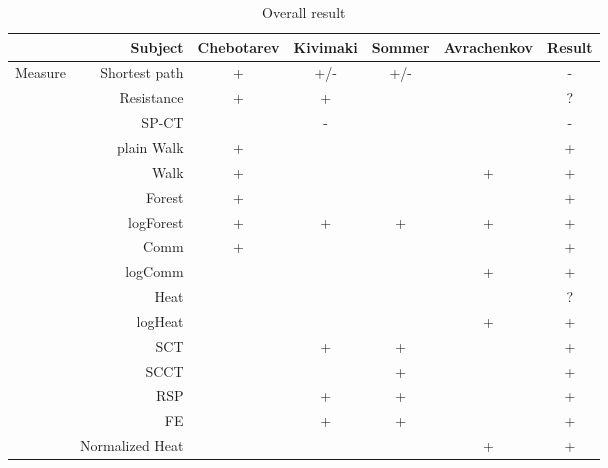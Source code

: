 \documentclass{article}
\begin{document}
\begin{table}[H]
\centering
\caption{Overall result}
\label{my-label}
\begin{tabular}{rr|cccc|c}
                & Subject                        & Chebotarev & Kivimaki & Sommer & Avrachenkov & Result \\
                \hline
Measure         & Shortest path                  & +          & \cellcolor{red!25} +/- & \cellcolor{red!25} +/- & & \cellcolor{red!25} - \\
                & Resistance            & +          & +        &        &             & \cellcolor{red!25} ? \\
                & SP-CT              &            & \cellcolor{red!25} - & & & \cellcolor{red!25} - \\
                & plain Walk                     & +          &          &        &             & +      \\
                & Walk                           & +          &          &        & +           & +      \\
                & Forest                         & +          &          &        &             & +      \\
                & logForest                      & +          & +        & +      & +           & +      \\
                & Comm                & +          &          &        &             & +      \\
                & logComm             &            &          &        & +           & +      \\
                & Heat                           &            &          &        &             & ?      \\
                & logHeat                        &            &          &        & +           & +      \\
                & SCT                            &            & +        & +      &             & +      \\
                & SCCT                           &            &          & +      &             & +      \\
                & RSP                            &            & +        & +      &             & +      \\
                & FE                             &            & +        & +      &             & +      \\
                & Normalized Heat                &            &          &        & +           & +      \\

\end{tabular}
\end{table}
\end{document}
